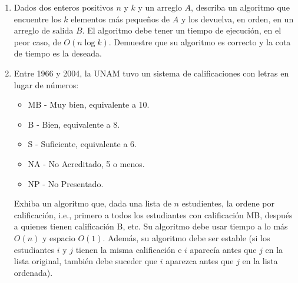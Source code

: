 \documentclass{article}
\begin{document}
\begin{enumerate}
\begin{enumerate}
            
            \noindent\begin{minipage}{\linewidth}
            \begin{algorithm}[H]
                \DontPrintSemicolon
                \caption{\textsc{OtroQuicksortModificado}}
            \end{algorithm}
            \end{minipage}

            
        \end{enumerate}

    \item Dados dos enteros positivos $n$ y $k$ y un arreglo $A$, describa un
        algoritmo que encuentre los $k$ elementos m\'as peque\~nos de $A$ y los
        devuelva, en orden, en un arreglo de salida $B$.   El algoritmo debe
        tener un tiempo de ejecuci\'on, en el peor caso, de $O(n \log k)$.
        Demuestre que su algoritmo es correcto y la cota de tiempo es la
        deseada.


        \medskip

    \item Entre 1966 y 2004, la UNAM tuvo un sistema de calificaciones con
        letras en lugar de n\'umeros:
        \begin{itemize}
            \item \textsf{MB} - Muy bien, equivalente a 10.
            \item \textsf{B} - Bien, equivalente a 8.
            \item \textsf{S} - Suficiente, equivalente a 6.
            \item \textsf{NA} - No Acreditado, 5 o menos.
            \item \textsf{NP} - No Presentado.
        \end{itemize}
        Exhiba un algoritmo que, dada una lista de $n$ estudientes, la ordene
        por calificaci\'on, i.e., primero a todos los estudiantes con
        calificaci\'on \textsf{MB}, despu\'es a quienes tienen calificaci\'on
        \textsf{B}, etc.   Su algoritmo debe usar tiempo a lo m\'as $O(n)$ y
        espacio $O(1)$.   Adem\'as, su algoritmo debe ser estable (si los
        estudiantes $i$ y $j$ tienen la misma calificaci\'on e $i$ aparec\'ia
        antes que $j$ en la lista original, tambi\'en debe suceder que $i$
        aparezca antes que $j$ en la lista ordenada).


\end{enumerate}
\end{document}

